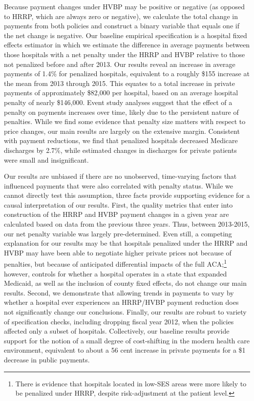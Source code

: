 \documentclass[12pt]{article}
\begin{document}
Because payment changes under HVBP may be positive or negative (as opposed to HRRP, which are always zero or negative), we calculate the total change in payments from both policies and construct a binary variable that equals one if the net change is negative.  Our baseline empirical specification is a hospital fixed effects estimator in which we estimate the difference in average payments between those hospitals with a net penalty under the HRRP and HVBP relative to those not penalized before and after 2013. Our results reveal an increase in average payments of 1.4\% for penalized hospitals, equivalent to a roughly \$155 increase at the mean from 2013 through 2015. This equates to a total increase in private payments of approximately \$82,000 per hospital, based on an average hospital penalty of nearly \$146,000.  Event study analyses suggest that the effect of a penalty on payments increases over time, likely due to the persistent nature of penalties.  While we find some evidence that penalty size matters with respect to price changes, our main results are largely on the extensive margin. Consistent with payment reductions, we find that penalized hospitals decreased Medicare discharges by 2.7\%, while estimated changes in discharges for private patients were small and insignificant.

Our results are unbiased if there are no unobserved, time-varying factors that influenced payments that were also correlated with penalty status.  While we cannot directly test this assumption, three facts provide supporting evidence for a causal interpretation of our results.  First, the quality metrics that enter into construction of the HRRP and HVBP payment changes in a given year are calculated based on data from the previous three years.  Thus, between 2013-2015, our net penalty variable was largely pre-determined.  Even still, a competing explanation for our results may be that hospitals penalized under the HRRP and HVBP may have been able to negotiate higher private prices not because of penalties, but because of anticipated differential impacts of the full ACA;\footnote{There is evidence that hospitals located in low-SES areas were more likely to be penalized under HRRP, despite risk-adjustment at the patient level.} however, controls for whether a hospital operates in a state that expanded Medicaid, as well as the inclusion of county fixed effects, do not change our main results. Second, we demonstrate that allowing trends in payments to vary by whether a hospital ever experiences an HRRP/HVBP payment reduction does not significantly change our conclusions. Finally, our results are robust to variety of specification checks, including dropping fiscal year 2012, when the policies affected only a subset of hospitals.  Collectively, our baseline results provide support for the notion of a small degree of cost-shifting in the modern health care environment, equivalent to about a 56 cent increase in private payments for a \$1 decrease in public payments.
\end{document}

